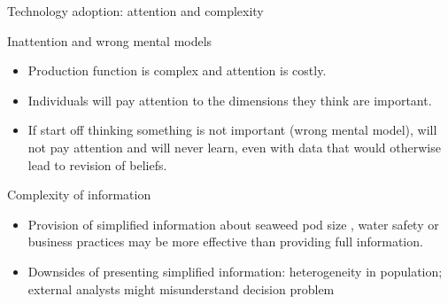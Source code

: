 \documentclass[aspectratio=169, 10pt, handout]{beamer}
\newenvironment{wideitemize}{\itemize\addtolength{\itemsep}{10pt}}{\enditemize}
\begin{document}
\begin{frame}{Technology adoption: attention and complexity}

\begin{wideitemize}

	\item Inattention and wrong mental models \citep{hanna2014learning} 

	\begin{itemize}

		\item Production function is complex and attention is costly. 
		
		\item Individuals will pay attention to the dimensions they think are important.

		\item If start off thinking something is not important (wrong mental model), will not pay attention and will never learn, even with data that would otherwise lead to revision of beliefs.

	\end{itemize}

	\item Complexity of information

	\begin{itemize}
	
		\item Provision of simplified information about seaweed pod size \citep{hanna2014learning}, water safety \citep{bennear2013impact} or business practices \citep{drexler2014keeping} may be more effective than providing full information.

        \item Downsides of presenting simplified information: heterogeneity in population; external analysts might misunderstand decision problem

	\end{itemize}
	
\end{wideitemize}


\end{frame}
\end{document}
